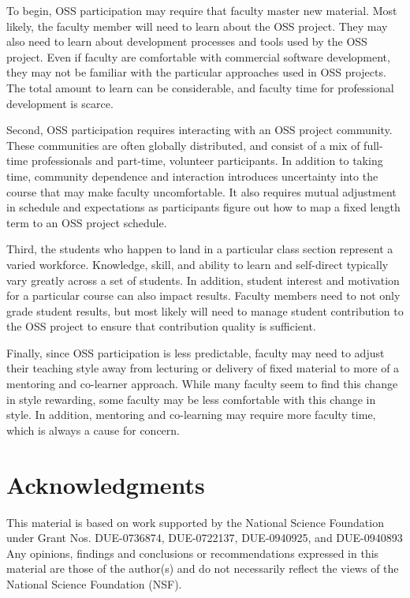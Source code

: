 \documentclass{sig-alternate}
\begin{document}
To begin, OSS participation may require that faculty master new material.  Most likely, the faculty member will need to learn about the OSS project.  They may also need to learn about development processes and tools used by the OSS project.  Even if faculty are comfortable with commercial software development, they may not be familiar with the particular approaches used in OSS projects.  The total amount to learn can be considerable, and faculty time for professional development is scarce.

Second, OSS participation requires interacting with an OSS project community.  These communities are often globally distributed, and consist of a mix of full-time professionals and part-time, volunteer participants.  In addition to taking time, community dependence and interaction introduces uncertainty into the course that may make faculty uncomfortable.  It also requires mutual adjustment in schedule and expectations as participants figure out how to map a fixed length term to an OSS project schedule.

Third, the students who happen to land in a particular class section represent a varied workforce.  Knowledge, skill, and ability to learn and self-direct typically vary greatly across a set of students. In addition, student interest and motivation for a particular course can also impact results.  Faculty members need to not only grade student results, but most likely will need to manage student contribution to the OSS project to ensure that contribution quality is sufficient.

Finally, since OSS participation is less predictable, faculty may need to adjust their teaching style away from lecturing or delivery of fixed material to more of a mentoring and co-learner approach.  While many faculty seem to find this change in style rewarding, some faculty may be less comfortable with this change in style.  In addition, mentoring and co-learning may require more faculty time, which is always a cause for concern.
    
\section{Acknowledgments}
This material is based on work supported by the National Science Foundation under Grant Nos. DUE-0736874, DUE-0722137, DUE-0940925, and DUE-0940893 Any opinions, findings and conclusions or recommendations expressed in this material are those of the author(s) and do not necessarily reflect the views of the National Science Foundation (NSF).
\end{document}
